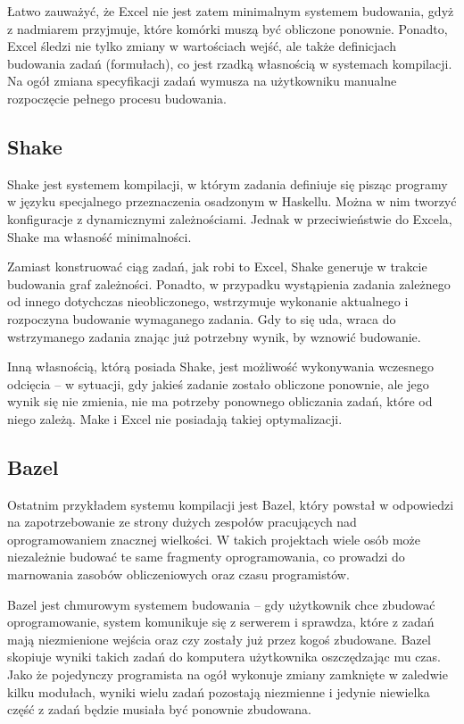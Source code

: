 Łatwo zauważyć, że Excel nie jest zatem minimalnym systemem budowania, gdyż z nadmiarem przyjmuje, które komórki muszą być obliczone ponownie. Ponadto, Excel śledzi nie tylko zmiany w wartościach wejść, ale także definicjach budowania zadań (formułach), co jest rzadką własnością w systemach kompilacji. Na ogół zmiana specyfikacji zadań wymusza na użytkowniku manualne rozpoczęcie pełnego procesu budowania.

\subsection{Shake}

Shake jest systemem kompilacji, w którym zadania definiuje się pisząc programy w języku specjalnego przeznaczenia osadzonym w Haskellu. Można w nim tworzyć konfiguracje z dynamicznymi zależnościami. Jednak w przeciwieństwie do Excela, Shake ma własność minimalności.

Zamiast konstruować ciąg zadań, jak robi to Excel, Shake generuje w trakcie budowania graf zależności. Ponadto, w przypadku wystąpienia zadania zależnego od innego dotychczas nieobliczonego, wstrzymuje wykonanie aktualnego i rozpoczyna budowanie wymaganego zadania. Gdy to się uda, wraca do wstrzymanego zadania znając już potrzebny wynik, by wznowić budowanie.

Inną własnością, którą posiada Shake, jest możliwość wykonywania wczesnego odcięcia -- w sytuacji, gdy jakieś zadanie zostało obliczone ponownie, ale jego wynik się nie zmienia, nie ma potrzeby ponownego obliczania zadań, które od niego zależą. Make i Excel nie posiadają takiej optymalizacji.

\subsection{Bazel}

Ostatnim przykładem systemu kompilacji jest Bazel, który powstał w odpowiedzi na zapotrzebowanie ze strony dużych zespołów pracujących nad oprogramowaniem znacznej wielkości. W takich projektach wiele osób może niezależnie budować te same fragmenty oprogramowania, co prowadzi do marnowania zasobów obliczeniowych oraz czasu programistów.

Bazel jest chmurowym systemem budowania -- gdy użytkownik chce zbudować oprogramowanie, system komunikuje się z serwerem i sprawdza, które z zadań mają niezmienione wejścia oraz czy zostały już przez kogoś zbudowane. Bazel skopiuje wyniki takich zadań do komputera użytkownika oszczędzając mu czas. Jako że pojedynczy programista na ogół wykonuje zmiany zamknięte w zaledwie kilku modułach, wyniki wielu zadań pozostają niezmienne i jedynie niewielka część z zadań będzie musiała być ponownie zbudowana.

